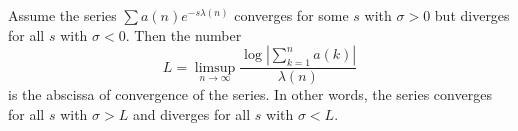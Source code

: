 Assume the series $\sum a(n)e^{-s\lambda(n)}$ converges for some $s$ with $\sigma > 0$ but diverges for all $s$ with $\sigma < 0$. Then the number
$$L = \limsup_{n \to \infty} \frac{\log \left|\sum_{k=1}^{n} a(k)\right|}{\lambda(n)}$$
is the abscissa of convergence of the series. In other words, the series converges for all $s$ with $\sigma > L$ and diverges for all $s$ with $\sigma < L$.

